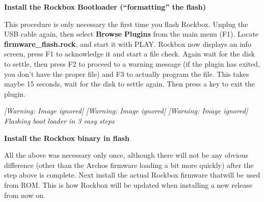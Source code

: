 {\bfseries
Install the Rockbox
Bootloader (``formatting'' the flash)}

This procedure is only necessary the first time you flash Rockbox. 
Unplug the USB cable again, then select \textbf{Browse
}\textbf{Plugins}\textbf{ } from the main menu (F1).  Locate \textbf{firmware\_flash.rock}, and start it with PLAY.  Rockbox now displays an info screen, press F1 to acknowledge it and start a file check. Again wait for the disk to
settle, then press F2 to proceed to a warning message (if the plugin
has exited, you don't have the proper file) and F3 to actually program
the file. This takes maybe 15 seconds, wait for the disk to settle
again. Then press a key to exit the plugin.

{\centering\itshape
  [Warning: Image ignored] %
     [Warning: Image ignored] %
 \textmd{  }  [Warning: Image ignored]
 \newline
Flashing boot loader in 3 easy steps
\par}

{\bfseries
\label{ref:FlashingRockbox}Install the Rockbox binary in flash}

All the above was necessary only once, although there will not be any
obvious difference (other than the Archos firmware loading a bit more quickly)
after the step above is complete.  Next install the actual Rockbox firmware thatwill be used from ROM.  This is how Rockbox will be updated when
installing a new release from now on. 

